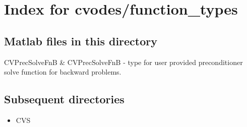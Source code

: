 \section{Index for {\sc cvodes/function_types}}

\subsection{Matlab files in this directory}

\begin{tabular}

CVPrecSolveFnB & CVPrecSolveFnB - type for user provided preconditioner solve function for backward problems.  \\
\end{tabular}


\subsection{Subsequent directories}

\begin{itemize}


\item CVS
\end{itemize}